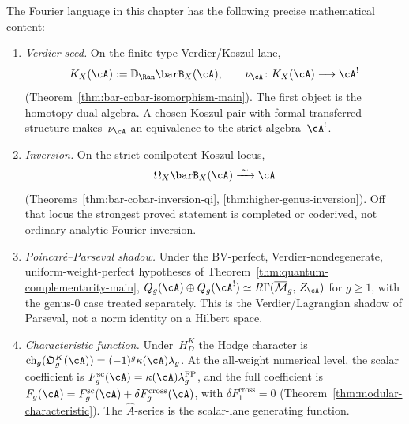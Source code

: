 \begin{theorem}
\label{thm:fourier-four-properties}
The Fourier language in this chapter has the following precise
mathematical content:
\begin{enumerate}[label=\textup{(\Alph*)}]
\item \emph{Verdier seed.}
On the finite-type Verdier/Koszul lane,
\[
 K_X(\cA):=\mathbb{D}_{\Ran}\barB_X(\cA),\qquad
 \nu_\cA\colon K_X(\cA)\longrightarrow\cA^!
\]
\textup{(}Theorem~\ref{thm:bar-cobar-isomorphism-main}\textup{)}.
 The first object is the homotopy dual algebra.  A chosen Koszul pair
 with formal transferred structure makes~$\nu_\cA$ an equivalence to
 the strict algebra~$\cA^!$.
\item \emph{Inversion.}
 On the strict conilpotent Koszul locus,
 \[
 \Omega_X\barB_X(\cA)\xrightarrow{\;\sim\;}\cA
 \]
 \textup{(}Theorems~\ref{thm:bar-cobar-inversion-qi},
 \ref{thm:higher-genus-inversion}\textup{)}. Off that locus the
 strongest proved statement is completed or coderived, not ordinary
 analytic Fourier inversion.
\item \emph{Poincar\'e--Parseval shadow.}
 Under the BV-perfect, Verdier-nondegenerate, uniform-weight-perfect
 hypotheses of Theorem~\ref{thm:quantum-complementarity-main},
 $Q_g(\cA) \oplus Q_g(\cA^!) \simeq
 R\Gamma(\overline{\mathcal{M}}_g,\, Z_{\cA})$ for $g\ge1$, with the
 genus-$0$ case treated separately. This is the Verdier/Lagrangian
 shadow of Parseval, not a norm identity on a Hilbert space.
\item \emph{Characteristic function.}
 Under~$H_D^K$ the Hodge character is
$\operatorname{ch}_g(\mathfrak O_g^K(\cA))=
(-1)^g\kappa(\cA)\lambda_g$.
At the all-weight numerical level, the scalar coefficient is
$F_g^{\mathrm{sc}}(\cA)=\kappa(\cA)\lambda_g^{\mathrm{FP}}$, and the
full coefficient is
$F_g(\cA)=F_g^{\mathrm{sc}}(\cA)
+\delta F_g^{\mathrm{cross}}(\cA)$, with
$\delta F_1^{\mathrm{cross}}=0$
\textup{(}Theorem~\ref{thm:modular-characteristic}\textup{)}. The
 $\hat A$-series is the scalar-lane generating function.
\end{enumerate}
\end{theorem}

